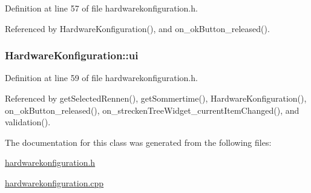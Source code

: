 Definition at line 57 of file hardwarekonfiguration.h.

Referenced by HardwareKonfiguration(), and on\_\-okButton\_\-released().\hypertarget{class_hardware_konfiguration_aa2f6fe4bcc16390f4ad5a6cfbbd5001}{
\subsubsection[ui]{ {\bf HardwareKonfiguration::ui}}}
\label{class_hardware_konfiguration_aa2f6fe4bcc16390f4ad5a6cfbbd5001}




Definition at line 59 of file hardwarekonfiguration.h.

Referenced by getSelectedRennen(), getSommertime(), HardwareKonfiguration(), on\_\-okButton\_\-released(), on\_\-streckenTreeWidget\_\-currentItemChanged(), and validation().

The documentation for this class was generated from the following files:\begin{CompactItemize}
\item 
\hyperlink{hardwarekonfiguration_8h}{hardwarekonfiguration.h}\item 
\hyperlink{hardwarekonfiguration_8cpp}{hardwarekonfiguration.cpp}\end{CompactItemize}
